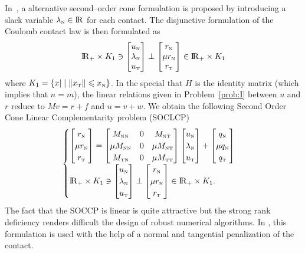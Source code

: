 In~\cite{Kanno.ea2006},  a alternative second--order cone formulation is proposed by introducing a slack variable $\lambda_{\hbox{\tiny{N}}}\in\mathrm{I\!R}$ for each contact. The disjunctive formulation of the Coulomb contact law is then formulated as
\begin{equation}
  \label{eq:kanno}
    \RR_+\times K_1 \ni
    \begin{bmatrix}
     u_\n \\ \lambda_\n \\  u_{\t}
    \end{bmatrix}
    \perp
    \begin{bmatrix}
     r_\n\\ \mu r_\n \\ r_{\t}
    \end{bmatrix}
    \in \RR_+ \times K_1
\end{equation}
where $K_1 =\{x | \mid  \|x_{\hbox{\tiny{T}}}\| \leqslant x_{\hbox{\tiny{N}}}  \}$. In the special that $H$ is the identity matrix (which implies that $n=m$), the linear relations given in Problem~\ref{prob:I} between $u$ and $r$ reduce to $Mv = r +f$ and $u = v+w $. We obtain the following Second Order Cone Linear Complementarity problem (SOCLCP)
\begin{equation}
  \label{eq:kanno1}
  \begin{cases}
    \begin{bmatrix}
      r_\n\\ \mu r_\n \\ r_{\t}
    \end{bmatrix} =
    \begin{bmatrix}
      M_{\n\n} & 0 & M_{\n\t} \\
      \mu M_{\n\n} & 0 & \mu M_{\n\t} \\
      M_{\t\n} & 0 & \mu M_{\t\t} \\
    \end{bmatrix}
    \begin{bmatrix}
      u_\n \\ \lambda_\n \\ u_{\t}
    \end{bmatrix} +
    \begin{bmatrix}
      q_\n \\ \mu q_\n \\ q_{\t}
    \end{bmatrix}
    \\
    \RR_+\times K_1 \ni
    \begin{bmatrix}
     u_\n \\ \lambda_\n \\  u_{\t}
    \end{bmatrix}
    \perp
    \begin{bmatrix}
     r_\n\\ \mu r_\n \\ r_{\t}
    \end{bmatrix}
    \in \RR_+ \times K_1.
  \end{cases}
\end{equation}
The fact that the SOCCP is linear is quite attractive but the strong rank deficiency renders difficult the design of robust numerical algorithms. In \cite{Zhang.ea_CMAME2011}, this formulation is used with the help of a normal and tangential penalization of the contact.


